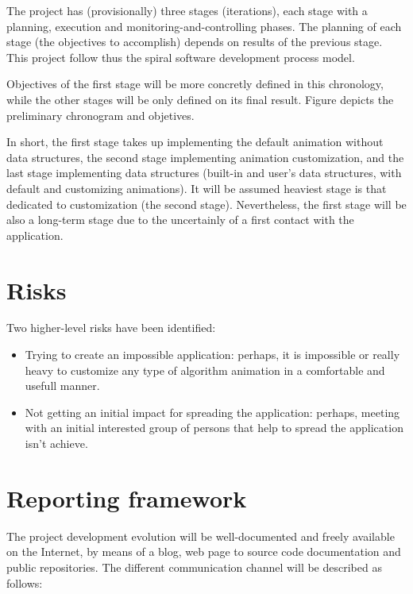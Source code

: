 \documentclass[twocolumn]{article}
\begin{document}
The project has (provisionally) three stages (iterations), each stage
with a planning,
execution and monitoring-and-controlling phases. The planning of each
stage (the objectives to accomplish) depends on results of the
previous stage. This project follow thus the spiral software
development process model.

Objectives of the first stage will be more concretly defined in this
chronology, while the other stages will be only defined on its final
result. Figure  depicts the preliminary chronogram and
objetives.

In short, the first stage takes up implementing the default animation
without data structures, the second stage implementing animation
customization, and the last stage implementing data structures
(built-in and user's data structures, with default and
customizing animations). It will be assumed heaviest stage is that
dedicated to customization (the second stage). Nevertheless, the first
stage will be also a long-term stage due to the uncertainly of a first
contact with the application.

\section{Risks}
Two higher-level risks have been identified:

\begin{itemize}
  \item Trying to create an impossible application: perhaps, it is
    impossible or really heavy to customize any type of algorithm
    animation in a comfortable and usefull manner.
  \item Not getting an initial impact for spreading the application:
    perhaps, meeting with an initial interested group of persons that
    help to spread the application isn't achieve.
\end{itemize}

\section{Reporting framework}
The project development evolution will be well-documented and freely
available on the Internet, by means of a blog, web page to source code
documentation and public repositories. The different communication
channel will be described as follows:
\end{document}
